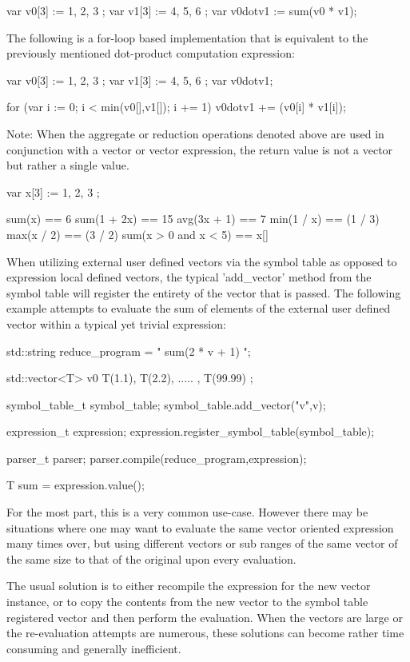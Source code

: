 var v0[3] := { 1, 2, 3 };
var v1[3] := { 4, 5, 6 };
var v0dotv1 := sum(v0 * v1);


The following is a for-loop based implementation that is equivalent to
the previously mentioned dot-product computation expression:

var v0[3] := { 1, 2, 3 };
var v1[3] := { 4, 5, 6 };
var v0dotv1;

for (var i := 0; i < min(v0[],v1[]); i += 1)
{
v0dotv1 += (v0[i] * v1[i]);
}


Note: When  the aggregate or reduction  operations denoted  above  are
used  in conjunction with a  vector or  vector  expression, the return
value is not a vector but rather a single value.

var x[3] := { 1, 2, 3 };

sum(x)      ==  6
sum(1 + 2x) == 15
avg(3x + 1) ==  7
min(1 / x)  == (1 / 3)
max(x / 2)  == (3 / 2)
sum(x > 0 and x < 5) == x[]


When utilizing external user defined  vectors via the symbol table  as
opposed to expression local defined vectors, the typical  'add\_vector'
method from the symbol table will register the entirety of the  vector
that is passed. The following example attempts to evaluate the sum  of
elements of  the external  user defined  vector within  a typical  yet
trivial expression:

std::string reduce\_program = " sum(2 * v + 1) ";

std::vector<T> v0 { T(1.1), T(2.2), ..... , T(99.99) };

symbol\_table\_t symbol\_table;
symbol\_table.add\_vector("v",v);

expression\_t expression;
expression.register\_symbol\_table(symbol\_table);

parser\_t parser;
parser.compile(reduce\_program,expression);

T sum = expression.value();


For the most part, this is  a very common use-case. However there  may
be situations where one may want to evaluate the same vector  oriented
expression many times over, but using different vectors or sub  ranges
of the same vector of the same size to that of the original upon every
evaluation.

The usual solution is to  either recompile the expression for  the new
vector instance, or to  copy the contents from  the new vector to  the
symbol table registered vector  and then perform the  evaluation. When
the  vectors are  large or  the re-evaluation  attempts are  numerous,
these  solutions  can  become  rather  time  consuming  and  generally
inefficient.

